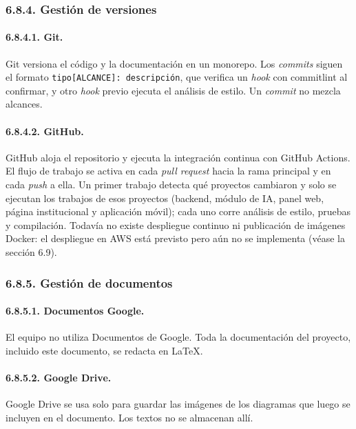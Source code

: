 \subsubsection{6.8.4. Gestión de versiones}

\paragraph{6.8.4.1. Git.}

Git versiona el código y la documentación en un monorepo. Los \textit{commits} siguen el formato \texttt{tipo[ALCANCE]: descripci\'on}, que verifica un \textit{hook} con commitlint al confirmar, y otro \textit{hook} previo ejecuta el análisis de estilo. Un \textit{commit} no mezcla alcances.

\paragraph{6.8.4.2. GitHub.}

GitHub aloja el repositorio y ejecuta la integración continua con GitHub Actions. El flujo de trabajo se activa en cada \textit{pull request} hacia la rama principal y en cada \textit{push} a ella. Un primer trabajo detecta qué proyectos cambiaron y solo se ejecutan los trabajos de esos proyectos (backend, módulo de IA, panel web, página institucional y aplicación móvil); cada uno corre análisis de estilo, pruebas y compilación. Todavía no existe despliegue continuo ni publicación de imágenes Docker: el despliegue en AWS está previsto pero aún no se implementa (véase la sección 6.9).

\subsubsection{6.8.5. Gestión de documentos}

\paragraph{6.8.5.1. Documentos Google.}

El equipo no utiliza Documentos de Google. Toda la documentación del proyecto, incluido este documento, se redacta en LaTeX.

\paragraph{6.8.5.2. Google Drive.}

Google Drive se usa solo para guardar las imágenes de los diagramas que luego se incluyen en el documento. Los textos no se almacenan allí.

